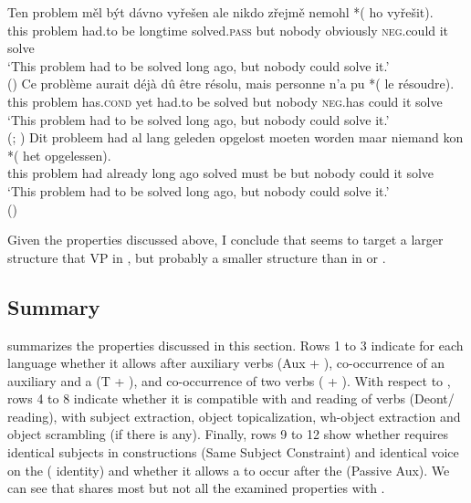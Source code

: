 \documentclass[output=paper,colorlinks,citecolor=brown,]{langsci/langscibook}
\begin{document}
\begin{exe}
\ex \label{30}
\begin{xlist}
\ex \label{30a}
\gll Ten problem měl být dávno vyřešen ale nikdo zřejmě nemohl *(\hspace{-2pt} ho vyřešit).\\
this problem had.to be longtime solved.\textsc{pass} but nobody obviously \textsc{neg}.could  {} it solve\\
\glt `This problem had to be solved long ago, but nobody could solve it.' \\ \hfill ()
\ex \label{30b}
\gll Ce problème aurait déjà dû être résolu, mais personne n'a pu *(\hspace{-2pt} le résoudre).\\
this problem has.\textsc{cond} yet had.to be solved but nobody \textsc{neg}.has could  {} it solve\\
\glt `This problem had to be solved long ago, but nobody could solve it.' \\ \hfill (; \citealt{Dagnac2010})
\ex \label{30c}
\gll  Dit probleem had al lang geleden opgelost moeten worden maar niemand  kon *(\hspace{-2pt} het opgelessen). \\
 this problem  had already long ago solved must be but nobody could {} it solve\\
\glt `This problem had to be solved long ago, but nobody could solve it.' \\  \hfill () \\
\end{xlist}
\end{exe}

\noindent Given the properties discussed above, I conclude that   seems to target a larger structure that VP  in , but probably a smaller structure than  in  or .

\subsection{Summary} \label{sec:4.3}

 summarizes the properties discussed in this section. Rows 1 to 3 indicate for each language whether it allows  after auxiliary verbs (Aux + ), co-occurrence of an auxiliary and a   (T + ), and co-occurrence of two  verbs ( + ). With respect to , rows 4 to 8 indicate whether it is compatible with  and  reading of  verbs (Deont/ reading), with subject extraction, object topicalization, wh-object extraction and object scrambling (if there is any). Finally, rows 9 to 12 show whether  requires identical subjects in  constructions (Same Subject Constraint) and identical voice on the  ( identity) and whether it allows a  to occur after the   (Passive Aux). We can see that  shares most but not all the examined properties with .
\end{document}
